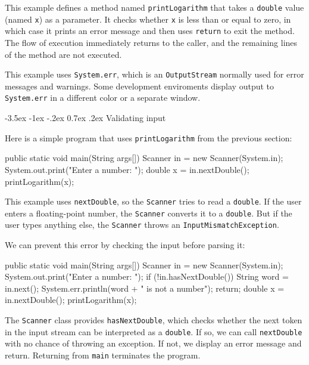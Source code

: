 \documentclass[12pt]{book}
\makeatletter
\theoremstyle{exercise}
\newcommand{\java}[1]{\verb"#1"}
\renewcommand{\section}{\@startsection{section}{1}{\z@}%
    {-3.5ex \@plus -1ex \@minus -.2ex}%
    {0.7ex \@plus.2ex}%
    {\normalfont\Large\bfseries}}
\newcommand{\java}[1]{\lstinline{#1}} %
\makeatother
\begin{document}
This example defines a method named \java{printLogarithm} that takes a \java{double} value (named \java{x}) as a parameter.
It checks whether \java{x} is less than or equal to zero, in which case it prints an error message and then uses \java{return} to exit the method.
The flow of execution immediately returns to the caller, and the remaining lines of the method are not executed.


This example uses \java{System.err}, which is an \java{OutputStream} normally used for error messages and warnings.
Some development enviroments display output to \java{System.err} in a different color or a separate window.


\section{Validating input}

Here is a simple program that uses \java{printLogarithm} from the previous section:

\begin{code}
    public static void main(String args[]) {
        Scanner in = new Scanner(System.in);
        System.out.print("Enter a number: ");
        double x = in.nextDouble();
        printLogarithm(x);
    }
\end{code}

This example uses \java{nextDouble}, so the \java{Scanner} tries to read a \java{double}.
If the user enters a floating-point number, the \java{Scanner} converts it to a \java{double}.
But if the user types anything else, the \java{Scanner} throws an
\java{InputMismatchException}.


We can prevent this error by checking the input before parsing it:

\begin{code}
    public static void main(String args[]) {
        Scanner in = new Scanner(System.in);
        System.out.print("Enter a number: ");
        if (!in.hasNextDouble()) {
            String word = in.next();
            System.err.println(word + " is not a number");
            return;
        }
        double x = in.nextDouble();
        printLogarithm(x);
    }
\end{code}

The \java{Scanner} class provides \java{hasNextDouble}, which checks whether the next token in the input stream can be interpreted as a \java{double}.
If so, we can call \java{nextDouble} with no chance of throwing an exception.
If not, we display an error message and return.
Returning from \java{main} terminates the program. 
\end{document}
